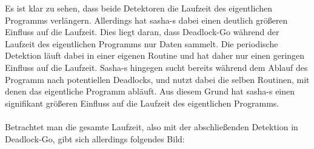Es ist klar zu sehen, dass beide Detektoren die Laufzeit des eigentlichen 
Programms verlängern. Allerdings hat sasha-s dabei einen deutlich größeren 
Einfluss auf die Laufzeit. Dies liegt daran, dass Deadlock-Go während der 
Laufzeit des eigentlichen Programms nur Daten sammelt. Die 
periodische Detektion läuft dabei in einer eigenen Routine und hat daher 
nur einen geringen Einfluss auf die Laufzeit. Sasha-s hingegen sucht bereits 
während dem Ablauf des Programm nach potentiellen Deadlocks, und nutzt dabei 
die selben Routinen, mit denen das eigentliche Programm abläuft. Aus diesem Grund
hat sasha-s einen signifikant größeren Einfluss auf die Laufzeit des eigentlichen
Programms. \\\\
Betrachtet man die gesamte Laufzeit, also mit der abschließenden Detektion in 
Deadlock-Go, gibt sich allerdings folgendes Bild:

